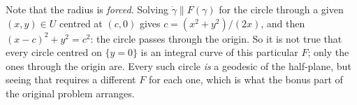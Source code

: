 \begin{exercisesolution}
\begin{enumerate}[label=\textbf{(\alph*)}]
    Note that the radius is \emph{forced}. Solving $\dot\gamma \parallel F(\gamma)$ for the circle
    through a given $(x,y) \in U$ centred at $(c,0)$ gives $c = (x^2+y^2)/(2x)$, and then $(x-c)^2 +
    y^2 = c^2$: the circle passes through the origin. So it is not true that every circle centred on
    $\{y=0\}$ is an integral curve of this particular $F$; only the ones through the origin are.
    Every such circle \emph{is} a geodesic of the half-plane, but seeing that requires a different
    $F$ for each one, which is what the bonus part of the original problem arranges.
\end{enumerate}
\end{exercisesolution}


